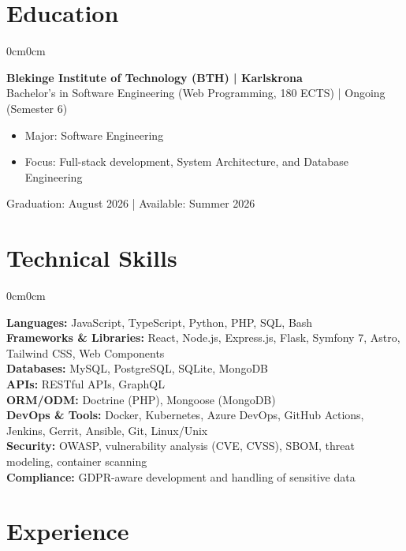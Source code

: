 \documentclass[10pt, letterpaper]{article}
\newenvironment{highlights}{
    \begin{itemize}[topsep=0.10cm, parsep=0.10cm, partopsep=0pt, itemsep=0pt, leftmargin=10pt]
}{
    \end{itemize}
}
\newenvironment{onecolentry}{
    \begin{adjustwidth}{0cm}{0cm}
}{
    \end{adjustwidth}
}
\begin{document}
    \section{Education}
    \begin{onecolentry}
        \textbf{Blekinge Institute of Technology (BTH) | Karlskrona} \\
        Bachelor's in Software Engineering (Web Programming, 180 ECTS) | Ongoing (Semester 6)
        \begin{highlights}
            \item Major: Software Engineering
            \item Focus: Full-stack development, System Architecture, and Database Engineering
        \end{highlights}
        Graduation: August 2026 | Available: Summer 2026
    \end{onecolentry}

    \section{Technical Skills}
    \begin{onecolentry}
        \textbf{Languages:} JavaScript, TypeScript, Python, PHP, SQL, Bash \\[0.15cm]
        \textbf{Frameworks \& Libraries:} React, Node.js, Express.js, Flask, Symfony 7, Astro, Tailwind CSS, Web Components \\[0.15cm]
        \textbf{Databases:} MySQL, PostgreSQL, SQLite, MongoDB \\[0.15cm]
        \textbf{APIs:} RESTful APIs, GraphQL \\[0.15cm]
        \textbf{ORM/ODM:} Doctrine (PHP), Mongoose (MongoDB) \\[0.15cm]
        \textbf{DevOps \& Tools:} Docker, Kubernetes, Azure DevOps, GitHub Actions, Jenkins, Gerrit, Ansible, Git, Linux/Unix \\[0.15cm]
        \textbf{Security:} OWASP, vulnerability analysis (CVE, CVSS), SBOM, threat modeling, container scanning \\[0.15cm]
        \textbf{Compliance:} GDPR-aware development and handling of sensitive data
    \end{onecolentry}

    \section{Experience}
\end{document}
